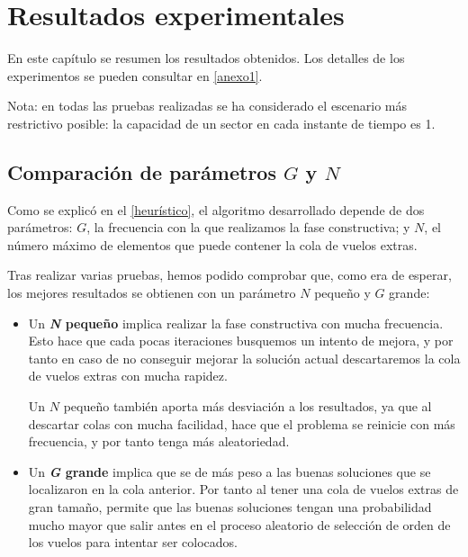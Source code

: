 \chapter{Resultados experimentales}
\label{resultados}

En este capítulo se resumen los resultados obtenidos. Los detalles de los experimentos se pueden consultar en \autoref{anexo1}.

Nota: en todas las pruebas realizadas se ha considerado el escenario más restrictivo posible: la capacidad de un sector en cada instante de tiempo es 1.

\section{Comparación de parámetros $G$ y $N$}
Como se explicó en el \autoref{heurístico}, el algoritmo desarrollado depende de dos parámetros: $G$, la frecuencia con la que realizamos la fase constructiva; y $N$, el número máximo de elementos que puede contener la cola de vuelos extras.

Tras realizar varias pruebas, hemos podido comprobar que, como era de esperar, los mejores resultados se obtienen con un parámetro $N$ pequeño y $G$ grande:
\begin{itemize}
	\item Un \textbf{\textit{N} pequeño} implica realizar la fase constructiva con mucha frecuencia. Esto hace que cada pocas iteraciones busquemos un intento de mejora, y por tanto en caso de no conseguir mejorar la solución actual descartaremos la cola de vuelos extras con mucha rapidez.
	
	Un $N$ pequeño también aporta más desviación a los resultados, ya que al descartar colas con mucha facilidad, hace que el problema se reinicie con más frecuencia, y por tanto tenga más aleatoriedad. 
	
	\item Un \textbf{\textit{G} grande} implica que se de más peso a las buenas soluciones que se localizaron en la cola anterior. Por tanto al tener una cola de vuelos extras de gran tamaño, permite que las buenas soluciones tengan una probabilidad mucho mayor que salir antes en el proceso aleatorio de selección de orden de los vuelos para intentar ser colocados.
\end{itemize} 

